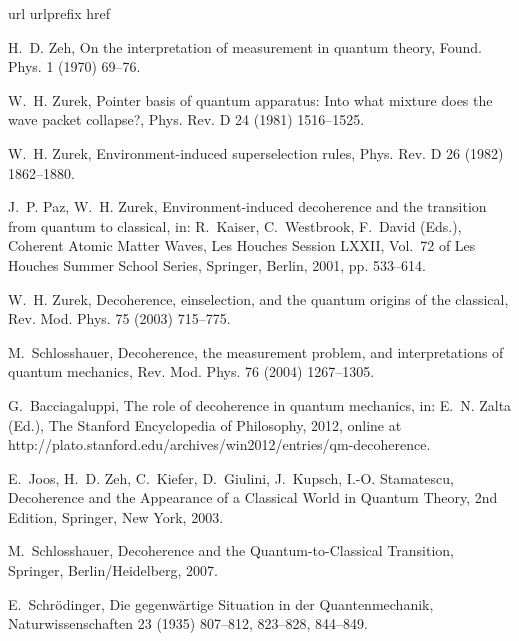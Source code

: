 \documentclass[3p,sort&compress]{elsarticle}
\begin{document}
% 

\begin{thebibliography}{100}
\expandafter\ifx\csname url\endcsname\relax
  \def\url#1{\texttt{#1}}\fi
\expandafter\ifx\csname urlprefix\endcsname\relax\def\urlprefix{URL }\fi
\expandafter\ifx\csname href\endcsname\relax
  \def\href#1#2{#2} \def\path#1{#1}\fi

H.~D. Zeh, On the interpretation of measurement in quantum theory, Found. Phys.
  1 (1970) 69--76.

W.~H. Zurek, Pointer basis of quantum apparatus: {I}nto what mixture does the
  wave packet collapse?, Phys. Rev. D 24 (1981) 1516--1525.

W.~H. Zurek, Environment-induced superselection rules, Phys. Rev. D 26 (1982)
  1862--1880.

J.~P. Paz, W.~H. Zurek, Environment-induced decoherence and the transition from
  quantum to classical, in: R.~Kaiser, C.~Westbrook, F.~David (Eds.), Coherent
  Atomic Matter Waves, Les Houches Session LXXII, Vol.~72 of Les Houches Summer
  School Series, Springer, Berlin, 2001, pp. 533--614.

W.~H. Zurek, Decoherence, einselection, and the quantum origins of the
  classical, Rev. Mod. Phys. 75 (2003) 715--775.

M.~Schlosshauer, Decoherence, the measurement problem, and interpretations of
  quantum mechanics, Rev. Mod. Phys. 76 (2004) 1267--1305.

G.~Bacciagaluppi, The role of decoherence in quantum mechanics, in: E.~N. Zalta
  (Ed.), The Stanford Encyclopedia of Philosophy, 2012, online at \href{http://plato.stanford.edu/archives/win2012/entries/qm-decoherence}{\path{http://plato.stanford.edu/archives/win2012/entries/qm-decoherence}}.

E.~Joos, H.~D. Zeh, C.~Kiefer, D.~Giulini, J.~Kupsch, I.-O. Stamatescu,
  Decoherence and the Appearance of a Classical World in Quantum Theory, 2nd
  Edition, Springer, New York, 2003.

M.~Schlosshauer, Decoherence and the Quantum-to-Classical Transition, Springer,
  Berlin/Heidelberg, 2007.

E.~Schr{\"o}dinger, Die gegenw{\"a}rtige {S}ituation in der {Q}uantenmechanik,
  Naturwissenschaften 23 (1935) 807--812, 823--828, 844--849.


\end{thebibliography}
\end{document}
